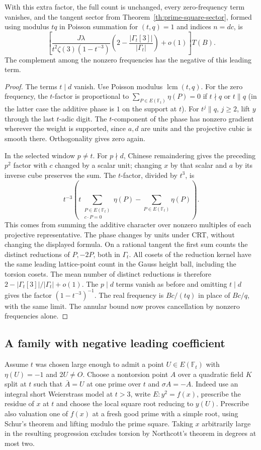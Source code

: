 \documentclass[11pt]{article}
\begin{document}
\begin{psqtheorem}
With this extra factor, the full count is unchanged, every zero-frequency term vanishes, and the tangent sector from Theorem~\ref{th:prime-square-sector}, formed using modulus $tq$ in Poisson summation for $(t,q)=1$ and indices $n=dc$, is
\[
 \left[\frac{J\lambda}{t^2\zeta(3)(1-t^{-3})}
       \left(2-\frac{|\Gamma_t[3]|}{|\Gamma_t|}\right)+o(1)\right]T(B).
\]
The complement among the nonzero frequencies has the negative of this leading term.
\end{psqtheorem}
\begin{proof}
The terms $t\mid d$ vanish. Use Poisson modulus $\operatorname{lcm}(t,q)$. For the zero frequency, the $t$-factor is proportional to $\sum_{P\in E(\mathbb F_t)}\eta(P)=0$ if $t\nmid q$ or $t\|q$ (in the latter case the additive phase is $1$ on the support at $t$). For $t^j\|q$, $j\ge2$, lift $y$ through the last $t$-adic digit. The $t$-component of the phase has nonzero gradient wherever the weight is supported, since $a,d$ are units and the projective cubic is smooth there. Orthogonality gives zero again.

In the selected window $p\ne t$. For $p\nmid d$, Chinese remaindering gives the preceding $p^2$ factor with $c$ changed by a scalar unit; changing $x$ by that scalar and $a$ by its inverse cube preserves the sum. The $t$-factor, divided by $t^3$, is
\[
 t^{-3}\left(t\sum_{\substack{P\in E(\mathbb F_t)\\c\cdot P=0}}\eta(P)
              -\sum_{P\in E(\mathbb F_t)}\eta(P)\right).
\]
This comes from summing the additive character over nonzero multiples of each projective representative. The phase changes by units under CRT, without changing the displayed formula. On a rational tangent the first sum counts the distinct reductions of $P,-2P$, both in $\Gamma_t$. All cosets of the reduction kernel have the same leading lattice-point count in the Gauss height ball, including the torsion cosets. The mean number of distinct reductions is therefore $2-|\Gamma_t[3]|/|\Gamma_t|+o(1)$. The $p\mid d$ terms vanish as before and omitting $t\mid d$ gives the factor $(1-t^{-3})^{-1}$. The real frequency is $Bc/(tq)$ in place of $Bc/q$, with the same limit. The annular bound now proves cancellation by nonzero frequencies alone.
\end{proof}

\subsection{A family with negative leading coefficient}
Assume $t$ was chosen large enough to admit a point $U\in E(\mathbb F_t)$ with $\eta(U)=-1$ and $2U\ne O$. Choose a nontorsion point $A$ over a quadratic field $K$ split at $t$ such that $\bar A=U$ at one prime over $t$ and $\sigma A=-A$. Indeed use an integral short Weierstrass model at $t>3$, write $E:y^2=f(x)$, prescribe the residue of $x$ at $t$ and choose the local square root reducing to $y(U)$. Prescribe also valuation one of $f(x)$ at a fresh good prime with a simple root, using Schur's theorem and lifting modulo the prime square. Taking $x$ arbitrarily large in the resulting progression excludes torsion by Northcott's theorem in degrees at most two.
\end{document}
